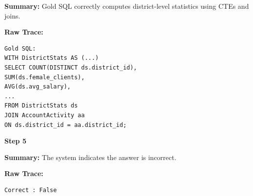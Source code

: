 \documentclass[11pt]{article}
\begin{document}
\begin{tcolorbox}[
breakable,
colback=customwhite,
colframe=customred,
title=False Assumption,
fontupper=\fontfamily{pcr}\selectfont\scriptsize
]
\textbf{Summary:}  
Gold SQL correctly computes district-level statistics using CTEs and joins.

\textbf{Raw Trace:}
\begin{verbatim}
Gold SQL:
WITH DistrictStats AS (...)
SELECT COUNT(DISTINCT ds.district_id),
SUM(ds.female_clients),
AVG(ds.avg_salary),
...
FROM DistrictStats ds
JOIN AccountActivity aa
ON ds.district_id = aa.district_id;
\end{verbatim}

\medskip
\textbf{Step 5}

\textbf{Summary:}  
The system indicates the answer is incorrect.

\textbf{Raw Trace:}
\begin{verbatim}
Correct : False
\end{verbatim}

\end{tcolorbox}
\end{document}
